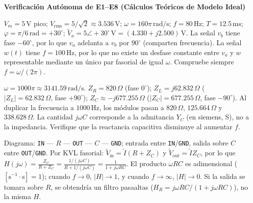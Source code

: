 \documentclass[11pt, a4paper]{article}
\newcommand{\phasor}[1]{\widetilde{#1}}
\begin{document}
\newpage
\begin{tcolorbox}[colback=ucbblue!5!white, colframe=ucbblue, title=\textbf{Respuestas de Autoestudio — CONSULTAR DESPUÉS DE RESOLVER LOS EJERCICIOS}]
    \centering \textbf{Verificación Autónoma de E1--E8 (Cálculos Teóricos de Modelo Ideal)}
\end{tcolorbox}

\begin{description}\setlength\itemsep{0.3cm}
    \item[E1:] $V_m = 5\,\text{V}$ pico; $V_{\text{rms}} = 5/\sqrt{2} \approx 3.536\,\text{V}$; $\omega = 160\pi\,\text{rad/s}$; $f = 80\,\text{Hz}$; $T = 12.5\,\text{ms}$; $\varphi = \pi/6\,\text{rad} = +30^\circ$; $\phasor{V}_a = 5\angle +30^\circ\,\text{V} = (4.330 + j2.500)\,\text{V}$. La señal $v_b$ tiene fase $-60^\circ$, por lo que $v_a$ adelanta a $v_b$ por $90^\circ$ (comparten frecuencia). La señal $w(t)$ tiene $f = 100\,\text{Hz}$, por lo que no existe un desfase constante entre $v_a$ y $w$ representable mediante un único par fasorial de igual $\omega$. Compruebe siempre $f = \omega/(2\pi)$.

    \item[E2:] $\omega = 1000\pi \approx 3141.59\,\text{rad/s}$. $Z_R = 820\,\Omega$ (fase $0^\circ$); $Z_L = j62.832\,\Omega$ ($|Z_L| = 62.832\,\Omega$, fase $+90^\circ$); $Z_C \approx -j677.255\,\Omega$ ($|Z_C| = 677.255\,\Omega$, fase $-90^\circ$). Al duplicar la frecuencia a $1000\,\text{Hz}$, los módulos pasan a $820\,\Omega$, $125.664\,\Omega$ y $338.628\,\Omega$. La cantidad $j\omega C$ corresponde a la admitancia $Y_C$ (en siemens, S), no a la impedancia. Verifique que la reactancia capacitiva disminuye al aumentar $f$.

    \item[E3:] Diagrama: \texttt{IN} --- $R$ --- \texttt{OUT} --- $C$ --- \texttt{GND}; entrada entre \texttt{IN}/\texttt{GND}, salida sobre $C$ entre \texttt{OUT}/\texttt{GND}. Por KVL fasorial: $\phasor{V}_{\text{in}} = \phasor{I}(R + Z_C)$ y $\phasor{V}_{\text{out}} = \phasor{I} Z_C$, por lo que $H(j\omega) = \frac{Z_C}{R + Z_C} = \frac{1/(j\omega C)}{R + 1/(j\omega C)} = \frac{1}{1 + j\omega RC}$. El producto $\omega RC$ es adimensional ($[\text{s}^{-1}\cdot\text{s}]=1$); cuando $f\to 0$, $|H|\to 1$, y cuando $f\to\infty$, $|H|\to 0$. Si la salida se tomara sobre $R$, se obtendría un filtro pasaaltas ($H_R = j\omega RC/(1+j\omega RC)$), no la misma $H$.


\end{description}
\end{document}
